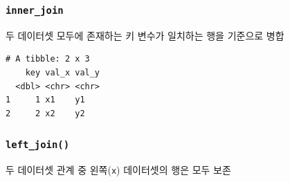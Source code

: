 \documentclass[
  11pt,
]{krantz}
\makeatletter
\newenvironment{Shaded}{\begin{snugshade}}{\end{snugshade}}
\newcommand{\DataTypeTok}[1]{\textcolor[rgb]{0.27,0.27,0.27}{#1}}
\newcommand{\DecValTok}[1]{\textcolor[rgb]{0.06,0.06,0.06}{#1}}
\newcommand{\KeywordTok}[1]{\textcolor[rgb]{0.27,0.27,0.27}{\textbf{#1}}}
\newcommand{\NormalTok}[1]{#1}
\newcommand{\OperatorTok}[1]{\textcolor[rgb]{0.43,0.43,0.43}{\textbf{#1}}}
\newcommand{\StringTok}[1]{\textcolor[rgb]{0.5,0.5,0.5}{#1}}
\newenvironment{kframe}{%
\medskip{}
\setlength{\fboxsep}{.8em}
 \def\at@end@of@kframe{}%
 \ifinner\ifhmode%
  \def\at@end@of@kframe{\end{minipage}}%
  \begin{minipage}{\columnwidth}%
 \fi\fi%
 \def\FrameCommand##1{\hskip\@totalleftmargin \hskip-\fboxsep
 \colorbox{shadecolor}{##1}\hskip-\fboxsep
     \hskip-\linewidth \hskip-\@totalleftmargin \hskip\columnwidth}%
 \MakeFramed {\advance\hsize-\width
   \@totalleftmargin\z@ \linewidth\hsize
   \@setminipage}}%
 {\par\unskip\endMakeFramed%
 \at@end@of@kframe}
\renewenvironment{quote}{\begin{kframe}}{\end{kframe}}
\makeatother
\begin{document}
\hypertarget{inner-join}{%
\subsubsection*{\texorpdfstring{\texttt{inner\_join}}{inner\_join}}\label{inner-join}}


\begin{quote}
두 데이터셋 모두에 존재하는 키 변수가 일치하는 행을 기준으로 병합
\end{quote}

\footnotesize

\begin{Shaded}
\end{Shaded}

\begin{verbatim}
# A tibble: 2 x 3
    key val_x val_y
  <dbl> <chr> <chr>
1     1 x1    y1   
2     2 x2    y2   
\end{verbatim}

\normalsize

\hypertarget{left-join}{%
\subsubsection*{\texorpdfstring{\texttt{left\_join()}}{left\_join()}}\label{left-join}}


\begin{quote}
두 데이터셋 관계 중 왼쪽(\texttt{x}) 데이터셋의 행은 모두 보존
\end{quote}

\footnotesize

\begin{Shaded}
\end{Shaded}
\end{document}

